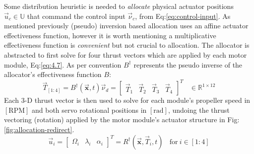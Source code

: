 \par
Some distribution heuristic is needed to \emph{allocate} physical actuator positions $\vec{u}_c\in\mathbb{U}$ that command the control input $\vec{\nu}_c$, from Eq:\ref{eq:control-input}. As mentioned previously (pseudo) inversion based allocation uses an affine actuator effectiveness function, however it is worth mentioning a multiplicative effectiveness function is \emph{convenient} but not crucial to allocation. The allocator is abstracted to first solve for four thrust vectors which are applied by each motor module, Eq:\ref{eq:4.7}. As per convention $B^\dagger$ represents the pseudo inverse of the allocator's effectiveness function $B$:
\begin{equation}\label{eq:5.1}
\vec{T}_{[1:4]}=B^{\dagger}(\vec{\mathbf{x}},t)\vec{\nu}_d=\begin{bmatrix}
\vec{T}_1&\vec{T}_2&\vec{T}_3&\vec{T}_4
\end{bmatrix}^T~~~~\in\mathbb{R}^{1\times 12}
\end{equation}
Each 3-D thrust vector is then used to solve for each module's propeller speed in $[\text{RPM}]$ and both servo rotational positions in $[\text{rad}]$, undoing the thrust vectoring (rotation) applied by the motor module's actuator structure in Fig:\ref{fig:allocation-redirect}.
\begin{equation}
\vec{u}_i = \begin{bmatrix}\Omega_i&\lambda_i&\alpha_i\end{bmatrix}^T=R^\dagger(\vec{\mathbf{x}},\vec{T}_i,t)~~~~\text{for}~i\in[1:4]
\end{equation}
